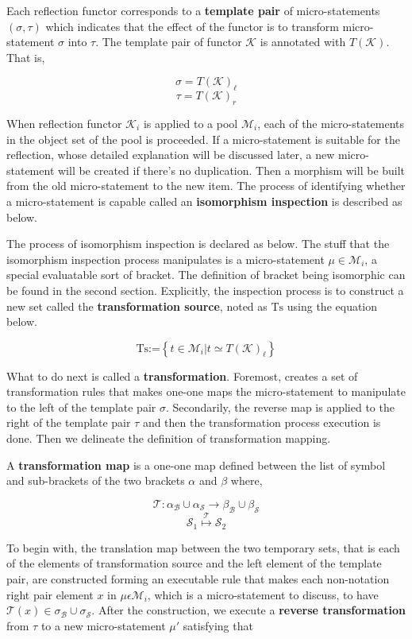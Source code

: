 \documentclass{article}
\begin{document}
Each reflection functor corresponds to a \textbf{ template pair} of micro-statements \((\sigma ,\tau )\) which indicates that the effect of the functor is to transform micro-statement \(\sigma\) into $\tau $. The template pair of functor \(\mathcal{K}\) is annotated with \(T(\mathcal{K})\). That
is,

\[\sigma =T(\mathcal{K})_{\ell }\]
\[\tau =T(\mathcal{K})_{\mathit{r}}\]

When reflection functor \(\mathcal{K}_i\) is applied to a pool \(\mathcal{M}_i\), each of the micro-statements in the object set of the pool is proceeded. If a micro-statement is suitable for the reflection, whose detailed explanation will be discussed later, a new micro-statement will be created if there{'}s no duplication. Then a morphism will be built from the old micro-statement to the new item. The process of identifying whether a micro-statement is capable called an \textbf{ isomorphism inspection} is described as below.

 The process of isomorphism inspection is declared as below. The stuff that the isomorphism inspection process manipulates is a micro-statement \(\mu \in \mathcal{M}_i\), a special evaluatable sort of bracket. The definition of bracket being isomorphic can be found in the second section. Explicitly, the inspection process is to construct a new set called the \textbf{ transformation source}, noted as \(\text{Ts}\) using the equation below.

\[\text{Ts}\text{:=}\left\{t\in \mathcal{M}_i|t\simeq T(\mathcal{K})_{\ell }\right\}\]

What to do next is called a \textbf{ transformation}. Foremost, creates a set of transformation rules that makes one-one maps the micro-statement to manipulate to the left of the template pair \(\sigma\). Secondarily, the reverse map is applied to the right of the template pair \(\tau\) and then the transformation process execution is done. Then we delineate the definition of { }transformation mapping.

 A \textbf{ transformation map} is a one-one map defined between the list of symbol and sub-brackets of the two brackets \(\alpha\) and \(\beta\) where,

\[\mathcal{T}:\alpha _{\mathcal{B}}\cup \alpha _{\mathcal{S}}\to \beta _{\mathcal{B}}\cup \beta _{\mathcal{S}}\]
\[\mathcal{S}_1\overset{\mathcal{T}}{\mapsto }\mathcal{S}_2\]

To begin with, the translation map between the two temporary sets, that is each of the elements of transformation source and the left element of the template pair, are constructed forming an executable rule that makes each non-notation right pair element \(x\) in \(\mu \epsilon \mathcal{M}_i\), which is a micro-statement to discuss, to have \(\mathcal{T}(x)\in \sigma _{\mathcal{B}}\cup \sigma _{\mathcal{S}}\). After the construction, we execute a \textbf{ reverse transformation } from \(\tau\) to a new micro-statement \(\mu '\) satisfying that
\end{document}
